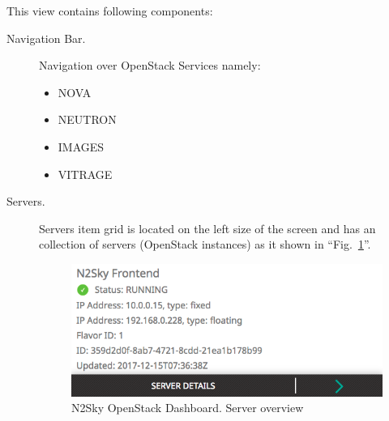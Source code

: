 This view contains following components:
\begin{description}
\item[Navigation Bar.] Navigation over OpenStack Services namely:
\begin{itemize}
\item NOVA
\item NEUTRON
\item IMAGES
\item VITRAGE
\end{itemize}
 
 \item[Servers.] Servers item grid is located on the left size of the screen and has an collection of servers (OpenStack instances) as it shown in ``Fig.~\ref{fig:openstack_servers}''. 
 
 \begin{figure}[htbp]
\begin{center}
  \includegraphics[scale=0.6]{components/4/pics/openstack_servers.png}
  \caption{N2Sky OpenStack Dashboard. Server overview}
  \label{fig:openstack_servers}
\end{center}
\end{figure}


\end{description}

